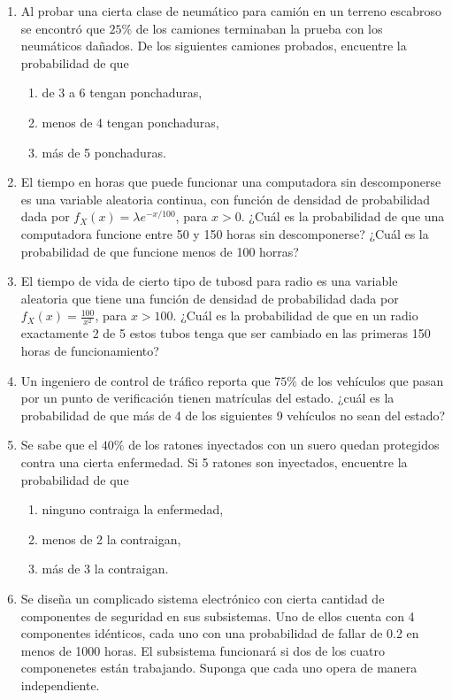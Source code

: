 \begin{Ejer}
\begin{enumerate}
\item Al probar una cierta clase de neumático para camión en un terreno escabroso se encontró que $25\%$ de los camiones terminaban la prueba con los neumáticos dañados. De los siguientes camiones probados, encuentre la probabilidad de que

\begin{enumerate}
\item de 3 a 6 tengan ponchaduras,
\item menos de 4 tengan ponchaduras,
\item más de 5 ponchaduras.
\end{enumerate}


\item El tiempo en horas que puede funcionar una computadora sin descomponerse es una variable aleatoria continua, con función de densidad de probabilidad dada por $f_{X}\left(x\right)=\lambda e^{-x/100}$, para $x>0$. ¿Cuál es la probabilidad de que una computadora funcione entre 50 y 150 horas sin descomponerse? ¿Cuál es la probabilidad de que funcione menos de 100 horras?

\item El tiempo de vida de cierto tipo de tubosd para radio es una variable aleatoria que tiene una función de densidad de probabilidad dada por $f_{X}\left(x\right)=\frac{100}{x^{2}}$, para $x>100$. ¿Cuál es la probabilidad de que en un radio exactamente 2 de 5 estos tubos tenga que ser cambiado en las primeras 150 horas de funcionamiento?
\item Un ingeniero de control de tráfico reporta que $75\%$ de los vehículos que pasan por un punto de verificación tienen matrículas del estado. ¿cuál es la probabilidad de que más de 4 de los siguientes 9 vehículos no sean del estado?

\item Se sabe que el $40\%$ de los ratones inyectados con un suero quedan protegidos contra una cierta enfermedad. Si 5 ratones son inyectados, encuentre la probabilidad de que

\begin{enumerate}
\item ninguno contraiga la enfermedad,
\item menos de 2 la contraigan,
\item más de 3 la contraigan.
\end{enumerate}

\item Se diseña un complicado sistema electrónico con cierta cantidad de componentes de seguridad en sus subsistemas. Uno de ellos cuenta con 4 componentes idénticos, cada uno con una probabilidad de fallar de 0.2 en menos de 1000 horas. El subsistema funcionará si dos de los cuatro componenetes están trabajando. Suponga que cada uno opera de manera independiente.


\end{enumerate}
\end{Ejer}
